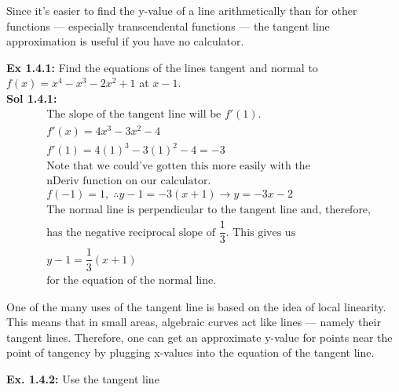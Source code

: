Since it's easier to find the y-value of a line arithmetically than for other functions --- especially transcendental functions --- the tangent line approximation is useful if you have no calculator. \par

\begin{center}
\end{center}

\textbf{Ex 1.4.1: } Find the equations of the lines tangent and normal to $f(x) = x^4 - x^3 - 2x^2 + 1$ at $x - 1$. \\[11pt]
\textbf{Sol 1.4.1: } \begin{align*}
    & \text{The slope of the tangent line will be } f'(1). \\[11pt] 
    & f'(x) = 4x^3 - 3x^2 - 4 \\[11pt]
    & f'(1) = 4(1)^3 - 3(1)^2 - 4 = -3 \\[11pt]
    & \text{Note that we could've gotten this more easily with the} \\
    & \text{nDeriv function on our calculator.} \\[11pt]
    & f(-1) = 1, \; \therefore y - 1 = -3(x + 1) \rightarrow y = -3x - 2 \\[11pt]
    & \text{The normal line is perpendicular to the tangent line and, therefore,} \\
    & \text{has the negative reciprocal slope of } \dfrac{1}{3}. \text{ This gives us} \\[11pt]
    & y - 1 = \dfrac{1}{3}(x + 1) \\[11pt]
    & \text{for the equation of the normal line.}
\end{align*} 

One of the many uses of the tangent line is based on the idea of local linearity. This means that in small areas, algebraic curves act like lines --- namely their tangent lines. Therefore, one can get an approximate y-value for points near the point of tangency by plugging x-values into the equation of the tangent line. \par

\textbf{Ex. 1.4.2: } Use the tangent line 
